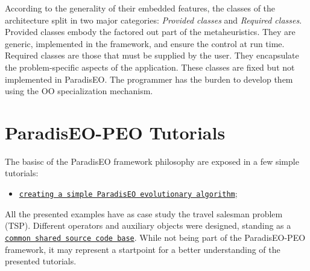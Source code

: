 According to the generality of their embedded features, the classes of the architecture split in two major categories: {\em Provided classes\/} and {\em Required classes\/}. Provided classes embody the factored out part of the metaheuristics. They are generic, implemented in the framework, and ensure the control at run time. Required classes are those that must be supplied by the user. They encapsulate the problem-specific aspects of the application. These classes are fixed but not implemented in Paradis\-EO. The programmer has the burden to develop them using the OO specialization mechanism.\hypertarget{main_tutorials}{}\section{Paradis\-EO-PEO Tutorials}\label{main_tutorials}
The basisc of the Paradis\-EO framework philosophy are exposed in a few simple tutorials: \begin{itemize}
\item \href{lesson1/html/main.html}{\tt creating a simple Paradis\-EO evolutionary algorithm};  \end{itemize}
All the presented examples have as case study the travel salesman problem (TSP). Different operators and auxiliary objects were designed, standing as a \href{lsnshared/html/index.html}{\tt common shared source code base}. While not being part of the Paradis\-EO-PEO framework, it may represent a startpoint for a better understanding of the presented tutorials. 